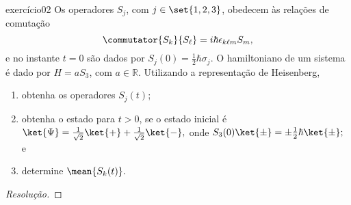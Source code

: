 \begin{exercício}{}{exercício02}
    Os operadores \(S_j\), com \(j \in \set{1,2,3}\), obedecem às relações de comutação 
    \begin{equation*}
        \commutator{S_k}{S_\ell} = i \hbar \epsilon_{k\ell m} S_m,
    \end{equation*}
    e no instante \(t = 0\) são dados por \(S_j(0) = \frac12 \hbar \sigma_j\). O hamiltoniano de um sistema é dado por \(H = a S_3\), com \(a \in \mathbb{R}\). Utilizando a representação de Heisenberg,
    \begin{enumerate}[label=(\alph*)]
        \item obtenha os operadores \(S_j(t)\);
        \item obtenha o estado para \(t > 0\), se o estado inicial é \(\ket{\Psi} = \frac1{\sqrt{2}} \ket{+} + \frac1{\sqrt{2}} \ket{-},\) onde \(S_3(0) \ket{\pm} = \pm \frac12 \hbar \ket{\pm};\) e 
        \item determine \(\mean{S_k(t)}.\)
    \end{enumerate}
\end{exercício}
\begin{proof}[Resolução]
    
\end{proof}
